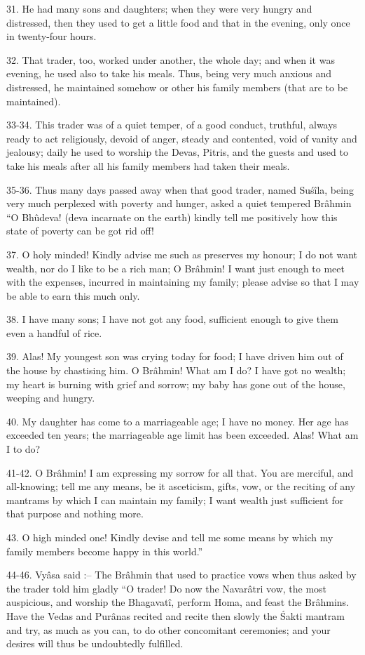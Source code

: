 31. He had many sons and daughters; when they were very hungry and distressed, then they used to get a little food and that in the evening, only once in twenty-four hours.

32. That trader, too, worked under another, the whole day; and when it was evening, he used also to take his meals. Thus, being very much anxious and distressed, he maintained somehow or other his family members (that are to be maintained).

33-34. This trader was of a quiet temper, of a good conduct, truthful, always ready to act religiously, devoid of anger, steady and contented, void of vanity and jealousy; daily he used to worship the Devas, Pitris, and the guests and used to take his meals after all his family members had taken their meals.

35-36. Thus many days passed away when that good trader, named Su\'s\^ila, being very much perplexed with poverty and hunger, asked a quiet tempered Br\^ahmin ``O Bhûdeva! (deva incarnate on the earth) kindly tell me positively how this state of poverty can be got rid off!

37. O holy minded! Kindly advise me such as preserves my honour; I do not want wealth, nor do I like to be a rich man; O Br\^ahmin! I want just enough to meet with the expenses, incurred in maintaining my family; please advise so that I may be able to earn this much only.

38. I have many sons; I have not got any food, sufficient enough to give them even a handful of rice.

39. Alas! My youngest son was crying today for food; I have driven him out of the house by chastising him. O Br\^ahmin! What am I do? I have got no wealth; my heart is burning with grief and sorrow; my baby has gone out of the house, weeping and hungry.

40. My daughter has come to a marriageable age; I have no money. Her age has exceeded ten years; the marriageable age limit has been exceeded. Alas! What am I to do?

41-42. O Br\^ahmin! I am expressing my sorrow for all that. You are merciful, and all-knowing; tell me any means, be it asceticism, gifts, vow, or the reciting of any mantrams by which I can maintain my family; I want wealth just sufficient for that purpose and nothing more.

43. O high minded one! Kindly devise and tell me some means by which my family members become happy in this world.''

44-46. Vy\^asa said :-- The Br\^ahmin that used to practice vows when thus asked by the trader told him gladly ``O trader! Do now the Navar\^atri vow, the most auspicious, and worship the Bhagavat\^i, perform Homa, and feast the Br\^ahmins. Have the Vedas and Pur\^anas recited and recite then slowly the \'Sakti mantram and try, as much as you can, to do other concomitant ceremonies; and your desires will thus be undoubtedly fulfilled.

